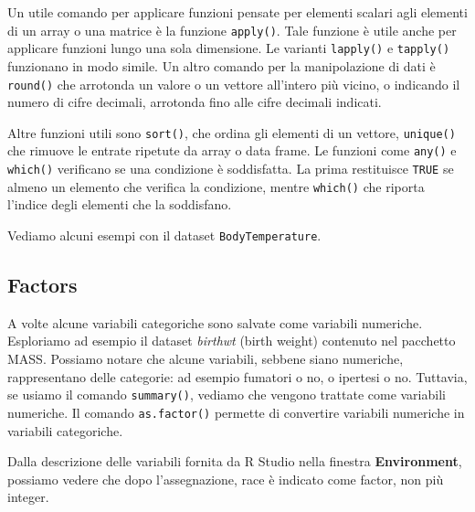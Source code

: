 \documentclass[]{book}
\newenvironment{Shaded}{\begin{snugshade}}{\end{snugshade}}
\newcommand{\KeywordTok}[1]{\textcolor[rgb]{0.13,0.29,0.53}{\textbf{#1}}}
\newcommand{\NormalTok}[1]{#1}
\newcommand{\OperatorTok}[1]{\textcolor[rgb]{0.81,0.36,0.00}{\textbf{#1}}}
\newcommand{\StringTok}[1]{\textcolor[rgb]{0.31,0.60,0.02}{#1}}
\begin{document}
Un utile comando per applicare funzioni pensate per elementi scalari agli elementi di un array o una matrice è la funzione \texttt{apply()}. Tale funzione è utile anche per applicare funzioni lungo una sola dimensione. Le varianti \texttt{lapply()} e \texttt{tapply()} funzionano in modo simile. Un altro comando per la manipolazione di dati è \texttt{round()} che arrotonda un valore o un vettore all'intero più vicino, o indicando il numero di cifre decimali, arrotonda fino alle cifre decimali indicati.

Altre funzioni utili sono \texttt{sort()}, che ordina gli elementi di un vettore, \texttt{unique()} che rimuove le entrate ripetute da array o data frame. Le funzioni come \texttt{any()} e \texttt{which()} verificano se una condizione è soddisfatta. La prima restituisce \texttt{TRUE} se almeno un elemento che verifica la condizione, mentre \texttt{which()} che riporta l'indice degli elementi che la soddisfano.

Vediamo alcuni esempi con il dataset \texttt{BodyTemperature}.

\hypertarget{factors}{%
\subsection{Factors}\label{factors}}

A volte alcune variabili categoriche sono salvate come variabili numeriche. Esploriamo ad esempio il dataset \emph{birthwt} (birth weight) contenuto nel pacchetto MASS. Possiamo notare che alcune variabili, sebbene siano numeriche, rappresentano delle categorie: ad esempio fumatori o no, o ipertesi o no. Tuttavia, se usiamo il comando \texttt{summary()}, vediamo che vengono trattate come variabili numeriche. Il comando \texttt{as.factor()} permette di convertire variabili numeriche in variabili categoriche.

\begin{Shaded}
\end{Shaded}

Dalla descrizione delle variabili fornita da R Studio nella finestra \textbf{Environment}, possiamo vedere che dopo l'assegnazione, race è indicato come factor, non più integer.
\end{document}
